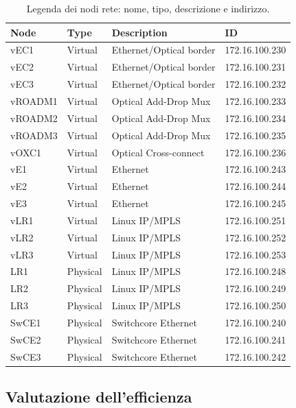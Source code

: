 \documentclass[10pt,a4paper]{report}
\begin{document}
\begin{table}[!htbp]
  \begin{center}
    \begin{tabular}{|l|l|l|l|}
      \hline
      Node & Type & Description & ID \\ \hline
      vEC1 & Virtual & Ethernet/Optical border & 172.16.100.230 \\
      vEC2 & Virtual & Ethernet/Optical border & 172.16.100.231 \\
      vEC3 & Virtual & Ethernet/Optical border & 172.16.100.232 \\
      vROADM1 & Virtual & Optical Add-Drop Mux & 172.16.100.233 \\
      vROADM2 & Virtual & Optical Add-Drop Mux & 172.16.100.234 \\
      vROADM3 & Virtual & Optical Add-Drop Mux & 172.16.100.235 \\
      vOXC1 & Virtual & Optical Cross-connect & 172.16.100.236 \\
      vE1 & Virtual & Ethernet & 172.16.100.243 \\
      vE2 & Virtual & Ethernet & 172.16.100.244 \\
      vE3 & Virtual & Ethernet & 172.16.100.245 \\
      vLR1 & Virtual & Linux IP/MPLS & 172.16.100.251 \\
      vLR2 & Virtual & Linux IP/MPLS & 172.16.100.252 \\
      vLR3 & Virtual & Linux IP/MPLS & 172.16.100.253 \\
      LR1 & Physical & Linux IP/MPLS & 172.16.100.248 \\
      LR2 & Physical & Linux IP/MPLS & 172.16.100.249 \\
      LR3 & Physical & Linux IP/MPLS & 172.16.100.250 \\
      SwCE1 & Physical & Switchcore Ethernet & 172.16.100.240 \\
      SwCE2 & Physical & Switchcore Ethernet & 172.16.100.241 \\
      SwCE3 & Physical & Switchcore Ethernet & 172.16.100.242 \\
      \hline
    \end{tabular}
    \caption[]{Legenda dei nodi rete: nome, tipo, descrizione e
      indirizzo.}
  \end{center}
\end{table}

\subsection*{Valutazione dell'efficienza}
\end{document}
